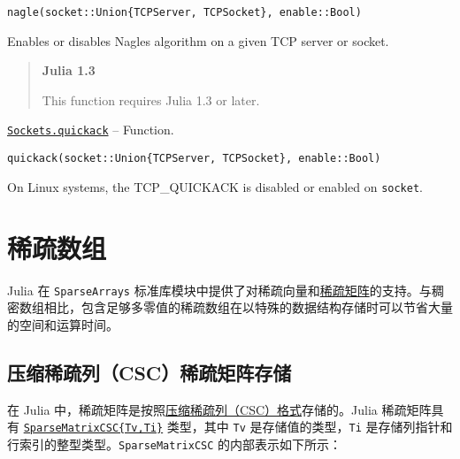 \begin{adjustwidth}{2em}{0pt}


\begin{verbatim}
nagle(socket::Union{TCPServer, TCPSocket}, enable::Bool)
\end{verbatim}

Enables or disables Nagle{\textquotesingle}s algorithm on a given TCP server or socket.

\begin{quote}
\textbf{Julia 1.3}

This function requires Julia 1.3 or later.

\end{quote}


\end{adjustwidth}
\hypertarget{14774922472341203206}{}
\hyperlink{14774922472341203206}{\texttt{Sockets.quickack}}  -- {Function.}

\begin{adjustwidth}{2em}{0pt}


\begin{verbatim}
quickack(socket::Union{TCPServer, TCPSocket}, enable::Bool)
\end{verbatim}

On Linux systems, the TCP\_QUICKACK is disabled or enabled on \texttt{socket}.



\end{adjustwidth}

\hypertarget{13048400462292431190}{}


\chapter{稀疏数组}





Julia 在 \texttt{SparseArrays} 标准库模块中提供了对稀疏向量和\href{https://en.wikipedia.org/wiki/Sparse\_matrix}{稀疏矩阵}的支持。与稠密数组相比，包含足够多零值的稀疏数组在以特殊的数据结构存储时可以节省大量的空间和运算时间。



\hypertarget{4438718230137239554}{}


\section{压缩稀疏列（CSC）稀疏矩阵存储}



在 Julia 中，稀疏矩阵是按照\href{https://en.wikipedia.org/wiki/Sparse\_matrix\#Compressed\_sparse\_column\_.28CSC\_or\_CCS.29}{压缩稀疏列（CSC）格式}存储的。Julia 稀疏矩阵具有 \hyperlink{15099699527958384292}{\texttt{SparseMatrixCSC\{Tv,Ti\}}} 类型，其中 \texttt{Tv} 是存储值的类型，\texttt{Ti} 是存储列指针和行索引的整型类型。\texttt{SparseMatrixCSC} 的内部表示如下所示：




